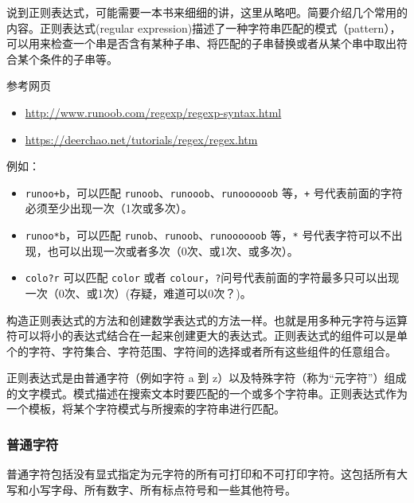 \documentclass[doctor,openright,twoside]{sjtuthesis}
\providecommand{\tightlist}{%
    \setlength{\itemsep}{0pt}\setlength{\parskip}{0pt}}
\newcommand{\passthrough}[1]{#1}
\theoremstyle{plain}
\theoremstyle{definition}
\theoremstyle{remark}
\theoremstyle{ocrenumbox}
\theoremstyle{plain}
\begin{document}
说到正则表达式，可能需要一本书来细细的讲，这里从略吧。简要介绍几个常用的内容。正则表达式(regular expression)描述了一种字符串匹配的模式（pattern），可以用来检查一个串是否含有某种子串、将匹配的子串替换或者从某个串中取出符合某个条件的子串等。

参考网页

\begin{itemize}
\tightlist
\item
  \url{http://www.runoob.com/regexp/regexp-syntax.html}
\item
  \url{https://deerchao.net/tutorials/regex/regex.htm}
\end{itemize}

例如：

\begin{itemize}
\tightlist
\item
  \passthrough{\lstinline!runoo+b!}，可以匹配 \passthrough{\lstinline!runoob!}、\passthrough{\lstinline!runooob!}、\passthrough{\lstinline!runoooooob!} 等，\passthrough{\lstinline!+!} 号代表前面的字符必须至少出现一次（1次或多次）。
\item
  \passthrough{\lstinline!runoo*b!}，可以匹配 \passthrough{\lstinline!runob!}、\passthrough{\lstinline!runoob!}、\passthrough{\lstinline!runoooooob!} 等，\passthrough{\lstinline!*!} 号代表字符可以不出现，也可以出现一次或者多次（0次、或1次、或多次）。
\item
  \passthrough{\lstinline!colo?r!} 可以匹配 \passthrough{\lstinline!color!} 或者 \passthrough{\lstinline!colour!}，\passthrough{\lstinline!?!}问号代表前面的字符最多只可以出现一次（0次、或1次）(存疑，难道可以0次？)。
\end{itemize}

构造正则表达式的方法和创建数学表达式的方法一样。也就是用多种元字符与运算符可以将小的表达式结合在一起来创建更大的表达式。正则表达式的组件可以是单个的字符、字符集合、字符范围、字符间的选择或者所有这些组件的任意组合。

正则表达式是由普通字符（例如字符 a 到 z）以及特殊字符（称为``元字符''）组成的文字模式。模式描述在搜索文本时要匹配的一个或多个字符串。正则表达式作为一个模板，将某个字符模式与所搜索的字符串进行匹配。

\hypertarget{section-85}{%
\subsubsection{普通字符}\label{section-85}}

普通字符包括没有显式指定为元字符的所有可打印和不可打印字符。这包括所有大写和小写字母、所有数字、所有标点符号和一些其他符号。
\end{document}
